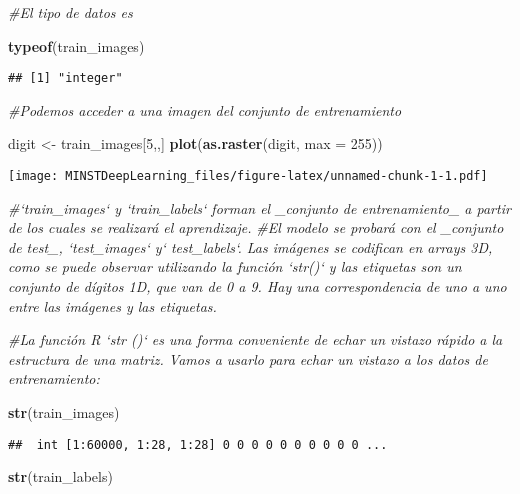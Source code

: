 \documentclass[]{article}
\newenvironment{Shaded}{\begin{snugshade}}{\end{snugshade}}
\newcommand{\CommentTok}[1]{\textcolor[rgb]{0.56,0.35,0.01}{\textit{#1}}}
\newcommand{\DataTypeTok}[1]{\textcolor[rgb]{0.13,0.29,0.53}{#1}}
\newcommand{\DecValTok}[1]{\textcolor[rgb]{0.00,0.00,0.81}{#1}}
\newcommand{\KeywordTok}[1]{\textcolor[rgb]{0.13,0.29,0.53}{\textbf{#1}}}
\newcommand{\NormalTok}[1]{#1}
\newcommand{\StringTok}[1]{\textcolor[rgb]{0.31,0.60,0.02}{#1}}
\begin{document}
\begin{Shaded}
\begin{Highlighting}[]
\CommentTok{#El tipo de datos es}

\KeywordTok{typeof}\NormalTok{(train_images)}
\end{Highlighting}
\end{Shaded}

\begin{verbatim}
## [1] "integer"
\end{verbatim}

\begin{Shaded}
\begin{Highlighting}[]
\CommentTok{#Podemos acceder a una imagen del conjunto de entrenamiento}

\NormalTok{digit <-}\StringTok{ }\NormalTok{train_images[}\DecValTok{5}\NormalTok{,,]}
\KeywordTok{plot}\NormalTok{(}\KeywordTok{as.raster}\NormalTok{(digit, }\DataTypeTok{max =} \DecValTok{255}\NormalTok{))}
\end{Highlighting}
\end{Shaded}

\texttt{[image: MINSTDeepLearning\_files/figure-latex/unnamed-chunk-1-1.pdf]}

\begin{Shaded}
\begin{Highlighting}[]
\CommentTok{#`train_images` y `train_labels` forman el _conjunto de entrenamiento_ a partir de los cuales se realizará el aprendizaje.}
\CommentTok{#El modelo se probará con el _conjunto de test_, `test_images` y` test_labels`. Las imágenes se codifican en arrays 3D, como se puede observar utilizando la función `str()` y las etiquetas son un conjunto de dígitos 1D, que van de 0 a 9. Hay una correspondencia de uno a uno entre las imágenes y las etiquetas.}

\CommentTok{#La función R `str ()` es una forma conveniente de echar un vistazo rápido a la estructura de una matriz. Vamos a usarlo para echar un vistazo a los datos de entrenamiento:}
  
 \KeywordTok{str}\NormalTok{(train_images)}
\end{Highlighting}
\end{Shaded}

\begin{verbatim}
##  int [1:60000, 1:28, 1:28] 0 0 0 0 0 0 0 0 0 0 ...
\end{verbatim}

\begin{Shaded}
\begin{Highlighting}[]
 \KeywordTok{str}\NormalTok{(train_labels)}
\end{Highlighting}
\end{Shaded}
\end{document}
